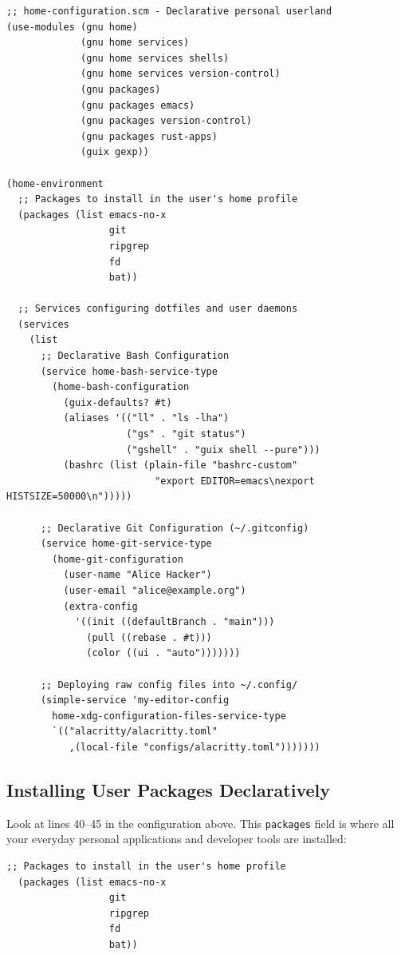 \begin{lstlisting}[style=guixscheme]
;; home-configuration.scm - Declarative personal userland
(use-modules (gnu home)
             (gnu home services)
             (gnu home services shells)
             (gnu home services version-control)
             (gnu packages)
             (gnu packages emacs)
             (gnu packages version-control)
             (gnu packages rust-apps)
             (guix gexp))

(home-environment
  ;; Packages to install in the user's home profile
  (packages (list emacs-no-x
                  git
                  ripgrep
                  fd
                  bat))

  ;; Services configuring dotfiles and user daemons
  (services
    (list
      ;; Declarative Bash Configuration
      (service home-bash-service-type
        (home-bash-configuration
          (guix-defaults? #t)
          (aliases '(("ll" . "ls -lha")
                     ("gs" . "git status")
                     ("gshell" . "guix shell --pure")))
          (bashrc (list (plain-file "bashrc-custom"
                          "export EDITOR=emacs\nexport HISTSIZE=50000\n")))))

      ;; Declarative Git Configuration (~/.gitconfig)
      (service home-git-service-type
        (home-git-configuration
          (user-name "Alice Hacker")
          (user-email "alice@example.org")
          (extra-config
            '((init ((defaultBranch . "main")))
              (pull ((rebase . #t)))
              (color ((ui . "auto")))))))

      ;; Deploying raw config files into ~/.config/
      (simple-service 'my-editor-config
        home-xdg-configuration-files-service-type
        `(("alacritty/alacritty.toml"
           ,(local-file "configs/alacritty.toml")))))))
\end{lstlisting}

\subsection{Installing User Packages Declaratively}

Look at lines 40--45 in the configuration above. This \texttt{packages} field is where all your everyday personal applications and developer tools are installed:

\begin{lstlisting}[style=guixscheme]
  ;; Packages to install in the user's home profile
  (packages (list emacs-no-x
                  git
                  ripgrep
                  fd
                  bat))
\end{lstlisting}


